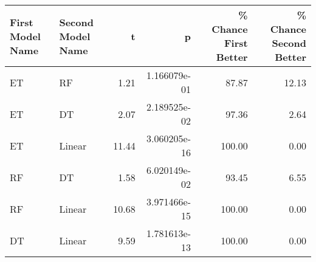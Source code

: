 \begin{tabular}{llrrrr}
\toprule
First Model Name & Second Model Name &     t &            p &  \% Chance First Better &  \% Chance Second Better \\
\midrule
              ET &                RF &  1.21 & 1.166079e-01 &                  87.87 &                   12.13 \\
              ET &                DT &  2.07 & 2.189525e-02 &                  97.36 &                    2.64 \\
              ET &            Linear & 11.44 & 3.060205e-16 &                 100.00 &                    0.00 \\
              RF &                DT &  1.58 & 6.020149e-02 &                  93.45 &                    6.55 \\
              RF &            Linear & 10.68 & 3.971466e-15 &                 100.00 &                    0.00 \\
              DT &            Linear &  9.59 & 1.781613e-13 &                 100.00 &                    0.00 \\
\bottomrule
\end{tabular}
